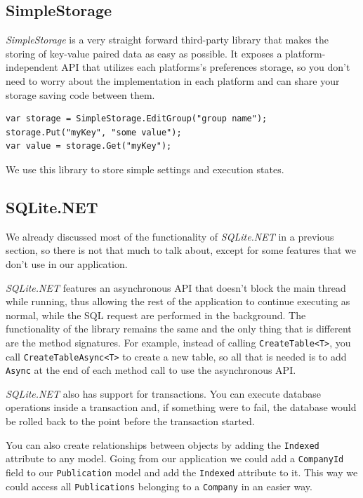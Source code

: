 \subsection{SimpleStorage}
\textit{SimpleStorage} is a very straight forward third-party library that makes the storing of key-value paired data as easy as possible. It exposes a platform-independent \ac{API} that utilizes each platforms's preferences storage, so you don't need to worry about the implementation in each platform and can share your storage saving code between them.

\begin{lstlisting}[frame=lt,caption=SimpleStorage,label={list:store}]
var storage = SimpleStorage.EditGroup("group name");
storage.Put("myKey", "some value");
var value = storage.Get("myKey");
\end{lstlisting}

We use this library to store simple settings and execution states.


\subsection{SQLite.NET}
We already discussed most of the functionality of \textit{SQLite.NET} in a previous section, so there is not that much to talk about, except for some features that we don't use in our application.

\textit{SQLite.NET} features an asynchronous \ac{API} that doesn't block the main thread while running, thus allowing the rest of the application to continue executing as normal, while the SQL request are performed in the background. The functionality of the library remains the same and the only thing that is different are the method signatures. For example, instead of calling \texttt{CreateTable<T>}, you call \texttt{CreateTableAsync<T>} to create a new table, so all that is needed is to add \texttt{Async} at the end of each method call to use the asynchronous \ac{API}.

\textit{SQLite.NET} also has support for transactions. You can execute database operations inside a transaction and, if something were to fail, the database would be rolled back to the point before the transaction started.

You can also create relationships between objects by adding the \texttt{Indexed} attribute to any model. Going from our application we could add a \texttt{CompanyId} field to our \texttt{Publication} model and add the \texttt{Indexed} attribute to it. This way we could access all \texttt{Publications} belonging to a \texttt{Company} in an easier way.  















